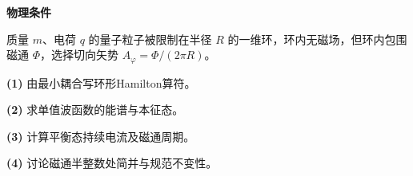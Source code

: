 \textbf{物理条件}\par 质量 \(m\)、电荷 \(q\) 的量子粒子被限制在半径 \(R\) 的一维环，环内无磁场，但环内包围磁通 \(\Phi\)，选择切向矢势 \(A_\varphi=\Phi/(2\pi R)\)。
\par\noindent\textbf{(1)} 由最小耦合写环形Hamilton算符。
\par\noindent\textbf{(2)} 求单值波函数的能谱与本征态。
\par\noindent\textbf{(3)} 计算平衡态持续电流及磁通周期。
\par\noindent\textbf{(4)} 讨论磁通半整数处简并与规范不变性。
